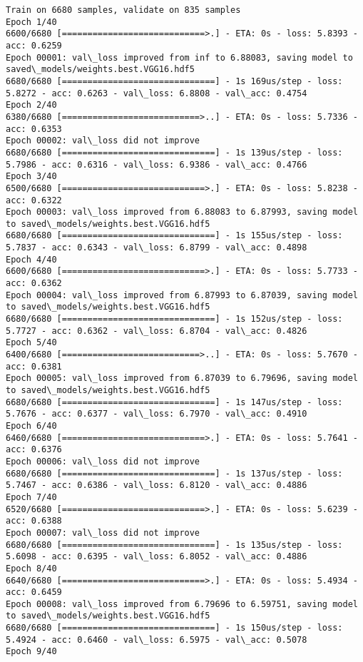 \documentclass[11pt]{article}
\begin{document}
    \begin{Verbatim}[commandchars=\\\{\}]
Train on 6680 samples, validate on 835 samples
Epoch 1/40
6600/6680 [============================>.] - ETA: 0s - loss: 5.8393 - acc: 0.6259
Epoch 00001: val\_loss improved from inf to 6.88083, saving model to saved\_models/weights.best.VGG16.hdf5
6680/6680 [==============================] - 1s 169us/step - loss: 5.8272 - acc: 0.6263 - val\_loss: 6.8808 - val\_acc: 0.4754
Epoch 2/40
6380/6680 [===========================>..] - ETA: 0s - loss: 5.7336 - acc: 0.6353
Epoch 00002: val\_loss did not improve
6680/6680 [==============================] - 1s 139us/step - loss: 5.7986 - acc: 0.6316 - val\_loss: 6.9386 - val\_acc: 0.4766
Epoch 3/40
6500/6680 [============================>.] - ETA: 0s - loss: 5.8238 - acc: 0.6322
Epoch 00003: val\_loss improved from 6.88083 to 6.87993, saving model to saved\_models/weights.best.VGG16.hdf5
6680/6680 [==============================] - 1s 155us/step - loss: 5.7837 - acc: 0.6343 - val\_loss: 6.8799 - val\_acc: 0.4898
Epoch 4/40
6600/6680 [============================>.] - ETA: 0s - loss: 5.7733 - acc: 0.6362
Epoch 00004: val\_loss improved from 6.87993 to 6.87039, saving model to saved\_models/weights.best.VGG16.hdf5
6680/6680 [==============================] - 1s 152us/step - loss: 5.7727 - acc: 0.6362 - val\_loss: 6.8704 - val\_acc: 0.4826
Epoch 5/40
6400/6680 [===========================>..] - ETA: 0s - loss: 5.7670 - acc: 0.6381
Epoch 00005: val\_loss improved from 6.87039 to 6.79696, saving model to saved\_models/weights.best.VGG16.hdf5
6680/6680 [==============================] - 1s 147us/step - loss: 5.7676 - acc: 0.6377 - val\_loss: 6.7970 - val\_acc: 0.4910
Epoch 6/40
6460/6680 [============================>.] - ETA: 0s - loss: 5.7641 - acc: 0.6376
Epoch 00006: val\_loss did not improve
6680/6680 [==============================] - 1s 137us/step - loss: 5.7467 - acc: 0.6386 - val\_loss: 6.8120 - val\_acc: 0.4886
Epoch 7/40
6520/6680 [============================>.] - ETA: 0s - loss: 5.6239 - acc: 0.6388
Epoch 00007: val\_loss did not improve
6680/6680 [==============================] - 1s 135us/step - loss: 5.6098 - acc: 0.6395 - val\_loss: 6.8052 - val\_acc: 0.4886
Epoch 8/40
6640/6680 [============================>.] - ETA: 0s - loss: 5.4934 - acc: 0.6459
Epoch 00008: val\_loss improved from 6.79696 to 6.59751, saving model to saved\_models/weights.best.VGG16.hdf5
6680/6680 [==============================] - 1s 150us/step - loss: 5.4924 - acc: 0.6460 - val\_loss: 6.5975 - val\_acc: 0.5078
Epoch 9/40

\end{Verbatim}
\end{document}

